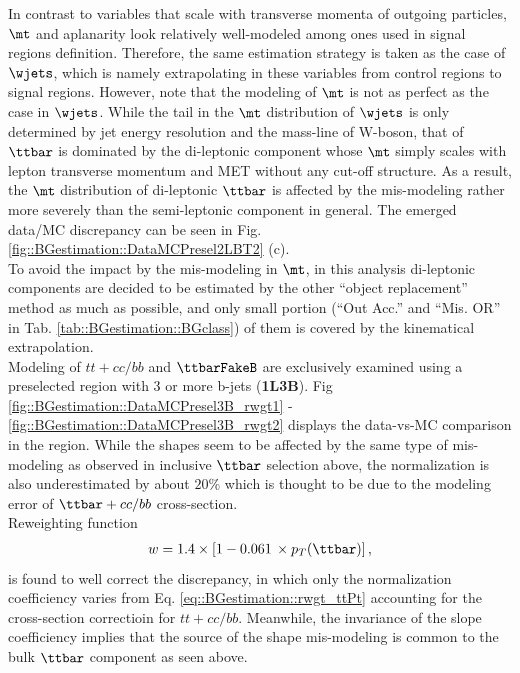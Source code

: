 \clearpage


\clearpage

In contrast to variables that scale with transverse momenta of outgoing particles, $\mt$ and aplanarity look relatively well-modeled among ones used in signal regions definition. Therefore, the same estimation strategy is taken as the case of $\wjets$, which is namely extrapolating in these variables from control regions to signal regions. However, note that the modeling of $\mt$ is not as perfect as the case in $\wjets$. While the tail in the $\mt$ distribution of $\wjets$ is only determined by jet energy resolution and the mass-line of W-boson, that of $\ttbar$ is dominated by the di-leptonic component whose $\mt$ simply scales with lepton transverse momentum and MET without any cut-off structure. As a result, the $\mt$ distribution of di-leptonic $\ttbar$ is affected by the mis-modeling rather more severely than the semi-leptonic component in general. The emerged data/MC discrepancy can be seen in Fig. \ref{fig::BGestimation::DataMCPresel2LBT2} (c). \\

To avoid the impact by the mis-modeling in $\mt$, in this analysis di-leptonic components are decided to be estimated by the other ``object replacement'' method as much as possible, and only small portion (``Out Acc.'' and ``Mis. OR'' in Tab. \ref{tab::BGestimation::BGclass}) of them is covered by the kinematical extrapolation. \\



Modeling of $tt+cc/bb$ and $\ttbarFakeB$ are exclusively examined using a preselected region with 3 or more b-jets (\textbf{1L3B}). Fig \ref{fig::BGestimation::DataMCPresel3B_rwgt1} - \ref{fig::BGestimation::DataMCPresel3B_rwgt2} displays the data-vs-MC comparison in the region. While the shapes seem to be affected by the same type of mis-modeling as observed in inclusive $\ttbar$ selection above, the normalization is also underestimated by about $20\%$ which is thought to be due to the modeling error of $\ttbar+cc/bb$ cross-section. \\

Reweighting function
\begin{align}
w = 1.4 \times \left[ 1 - 0.061 \,\times p_T(\ttbar) \right] \label{eq::BGestimation::rwgt_ttPt3B},
\end{align}
is found to well correct the discrepancy, in which only the normalization coefficiency varies from Eq. \ref{eq::BGestimation::rwgt_ttPt} accounting for the cross-section correctioin for $tt+cc/bb$. Meanwhile, the invariance of the slope coefficiency implies that the source of the shape mis-modeling is common to the bulk $\ttbar$ component as seen above. \\

